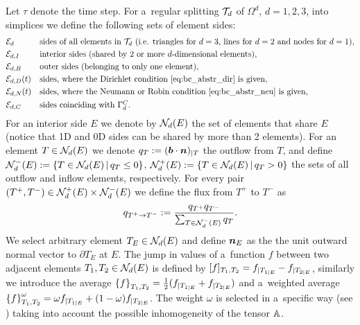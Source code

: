Let $\tau$ denote the time step.
For a~regular splitting $\mathcal T_d$ of $\Omega^d$, $d=1,2,3$, into simplices we define the following sets of element sides:
\begin{align*}
 &\mathcal E_d &&\mbox{sides of all elements in $\mathcal T_d$ (i.e. triangles for $d=3$, lines for $d=2$ and nodes for $d=1$)},\\
 &\mathcal E_{d,I} &&\mbox{interior sides (shared by 2 or more $d$-dimensional elements)},\\
 &\mathcal E_{d,B} &&\mbox{outer sides (belonging to only one element)},\\
 &\mathcal E_{d,D}(t) &&\mbox{sides, where the Dirichlet condition \eqref{eq:bc_abstr_dir} is given},\\
 &\mathcal E_{d,N}(t) &&\mbox{sides, where the Neumann or Robin condition \eqref{eq:bc_abstr_neu} is given},\\
 &\mathcal E_{d,C} &&\mbox{sides coinciding with $\Gamma^C_d$}.
\end{align*}
For an interior side $E$ we denote by $\mathcal N_d(E)$ the set of elements that share $E$ (notice that 1D and 0D sides can be shared by more than 2 elements).
For an element $T\in\mathcal N_d(E)$ we denote $q_T:=(\mathbf{\boldsymbol{b}}\cdot\mathbf{\boldsymbol{n}})_{|T}$ the outflow from $T$,
and define $\mathcal N_d^-(E):=\{T\in\mathcal N_d(E)\,|\, q_T\le 0\}$, $\mathcal N_d^+(E):=\{T\in\mathcal N_d(E)\,|\, q_T>0\}$
the sets of all outflow and inflow elements, respectively.
For every pair $(T^+,T^-)\in \mathcal N_d^+(E)\times\mathcal N_d^-(E)$ we define the flux from $T^+$ to $T^-$ as
$$ q_{T^+\to T^-} := \frac{q_{T^+} q_{T^-}}{\sum_{T\in\mathcal N_d^-(E)}{q_T}}.$$
We select arbitrary element $T_E\in\mathcal N_d(E)$ and define $\mathbf{\boldsymbol{n}}_E$ as the the unit outward normal vector to $\partial T_E$ at $E$.
The jump in values of a~function $f$ between two adjacent elements $T_1,T_2\in\mathcal N_d(E)$ is defined by $[f]_{T_1,T_2}=f_{|T_{1|E}}-f_{|T_{2|E}}$,
 similarly we introduce the average $\left\{f\right\}_{T_1,T_2}=\frac12(f_{|T_{1|E}} + f_{|T_{2|E}})$
 and a~weighted average $\left\{f\right\}_{T_1,T_2}^\omega=\omega f_{|T_{1|E}} + (1-\omega) f_{|T_{2|E}}$.
The weight $\omega$ is selected in a~specific way (see \cite{ern_stephansen_zunino})
 taking into account the possible inhomogeneity of the tensor ${\mathbb{A}}$.

